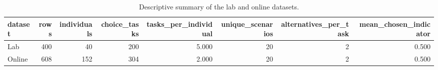 \begin{table}
\caption{Descriptive summary of the lab and online datasets.}
\label{tab:dataset_description}
\begin{tabular}{lrrrrrrr}
\toprule
dataset & rows & individuals & choice\_tasks & tasks\_per\_individual & unique\_scenarios & alternatives\_per\_task & mean\_chosen\_indicator \\
\midrule
Lab & 400 & 40 & 200 & 5.000 & 20 & 2 & 0.500 \\
Online & 608 & 152 & 304 & 2.000 & 20 & 2 & 0.500 \\
\bottomrule
\end{tabular}
\end{table}
